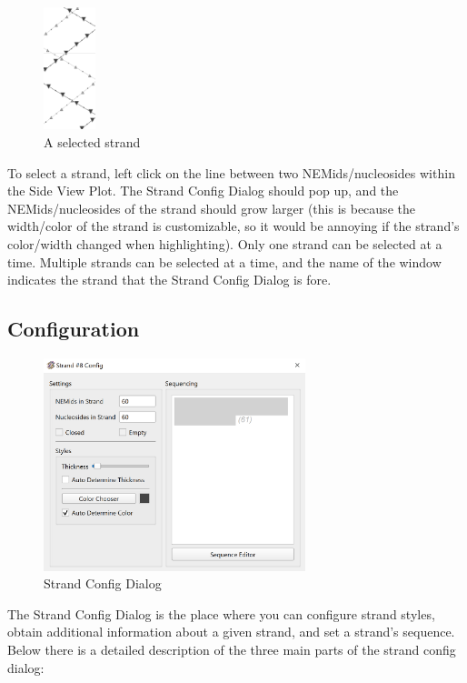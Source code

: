 \documentclass[titlepage]{article}
\begin{document}
\begin{figure}[h] \label{fig:selected-strand}
	\centering
	\includegraphics[height=1.4in]{selected-strand.png}
	\caption{A selected strand}
\end{figure}

To select a strand, left click on the line between two NEMids/nucleosides within the Side View Plot. The Strand Config Dialog should pop up, and the NEMids/nucleosides of the strand should grow larger (this is because the width/color of the strand is customizable, so it would be annoying if the strand's color/width changed when highlighting). Only one strand can be selected at a time. Multiple strands can be selected at a time, and the name of the window indicates the strand that the Strand Config Dialog is fore.

\subsection{Configuration}

\begin{figure}[h] \label{fig:strand-config-dialog}
	\centering
	\includegraphics[width=3in]{strand-config.png}
	\caption{Strand Config Dialog}
\end{figure}

The Strand Config Dialog is the place where you can configure strand styles, obtain additional information about a given strand, and set a strand's sequence. Below there is a detailed description of the three main parts of the strand config dialog:
\end{document}
